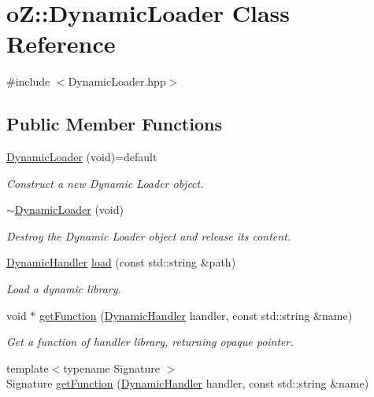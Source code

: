 \hypertarget{classo_z_1_1_dynamic_loader}{}\section{oZ\+::Dynamic\+Loader Class Reference}
\label{classo_z_1_1_dynamic_loader}


{\ttfamily \#include $<$Dynamic\+Loader.\+hpp$>$}

\subsection*{Public Member Functions}
\begin{DoxyCompactItemize}
\item 
\mbox{\hyperlink{classo_z_1_1_dynamic_loader_ab046e300c6645cc5fdb1e3c1d0c4690b}{Dynamic\+Loader}} (void)=default
\begin{DoxyCompactList}\small\item\em Construct a new Dynamic Loader object. \end{DoxyCompactList}\item 
\mbox{\hyperlink{classo_z_1_1_dynamic_loader_a48b8658929c54dbb03a79f752d2fc131}{$\sim$\+Dynamic\+Loader}} (void)
\begin{DoxyCompactList}\small\item\em Destroy the Dynamic Loader object and release its content. \end{DoxyCompactList}\item 
\mbox{\hyperlink{namespaceo_z_a4f8ae5685d0f7dca498d73129b482f2d}{Dynamic\+Handler}} \mbox{\hyperlink{classo_z_1_1_dynamic_loader_a1a0201ebc77bdd744aa528d7cb999a89}{load}} (const std\+::string \&path)
\begin{DoxyCompactList}\small\item\em Load a dynamic library. \end{DoxyCompactList}\item 
void $\ast$ \mbox{\hyperlink{classo_z_1_1_dynamic_loader_a136f9d35245f4e3d556d7f4eae951cdf}{get\+Function}} (\mbox{\hyperlink{namespaceo_z_a4f8ae5685d0f7dca498d73129b482f2d}{Dynamic\+Handler}} handler, const std\+::string \&name)
\begin{DoxyCompactList}\small\item\em Get a function of handler library, returning opaque pointer. \end{DoxyCompactList}\item 
{\footnotesize template$<$typename Signature $>$ }\\Signature \mbox{\hyperlink{classo_z_1_1_dynamic_loader_ad5c090a613bec9cf397a479bf3257cfa}{get\+Function}} (\mbox{\hyperlink{namespaceo_z_a4f8ae5685d0f7dca498d73129b482f2d}{Dynamic\+Handler}} handler, const std\+::string \&name)

\end{DoxyCompactItemize}
